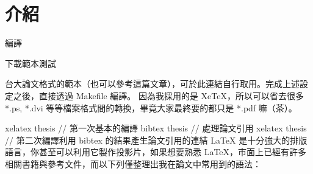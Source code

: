\section{介紹}


編譯

下載範本測試

台大論文格式的範本（也可以參考這篇文章），可於此連結自行取用。完成上述設定之後，直接透過 Makefile 編譯。
因為我採用的是 XeTeX，所以可以省去很多 *.ps, *.dvi 等等檔案格式間的轉換，畢竟大家最終要的都只是 *.pdf 嘛（茶）。

xelatex thesis // 第一次基本的編譯
bibtex thesis // 處理論文引用
xelatex thesis // 第二次編譯利用 bibtex 的結果產生論文引用的連結
LaTeX 是十分強大的排版語言，你甚至可以利用它製作投影片，如果想要熟悉 LaTeX，市面上已經有許多相關書籍與參考文件，而以下列僅整理出我在論文中常用到的語法：

\EndChapter
